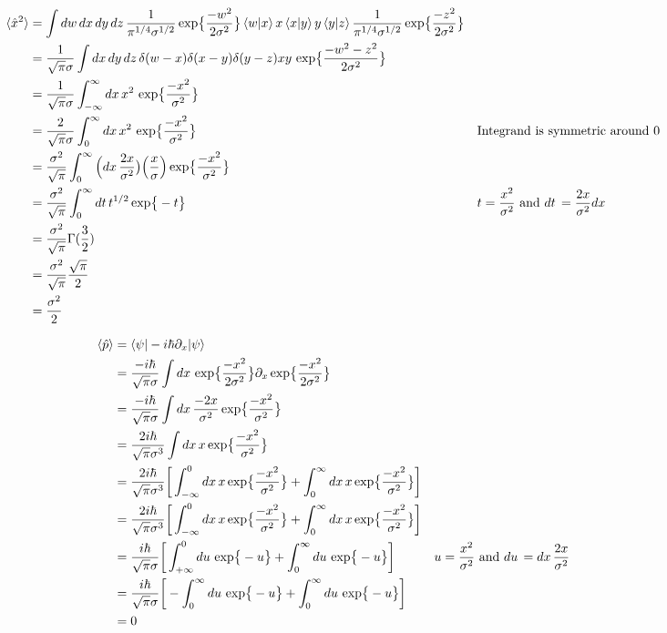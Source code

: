 \documentclass{article}
\newcommand{\D}[1]{{d#1 \,}}
\newcommand{\Poperator}[0]{-i \hbar \partial_x}
\renewcommand{\exp}[1]{\,\text{exp} \big\{ #1 \big\} }
\begin{document}
\begin{align*}
    \braket{\hat{x}^2}
    &= \int \D{w}\D{x}\D{y}\D{z}
        \frac{1}{\pi^{1/4}\sigma^{1/2}} \exp{\frac{-w^2}{2\sigma^2}}
        \braket{w|x}x\braket{x|y}y\braket{y|z}
        \frac{1}{\pi^{1/4}\sigma^{1/2}} \exp{\frac{-z^2}{2\sigma^2}} \\
    &= \frac{1}{\sqrt{\pi}\sigma} \int \D{x}\D{y}\D{z}
        \delta(w-x)\delta(x-y)\delta(y-z) xy \, \exp{\frac{-w^2-z^2}{2\sigma^2}} \\
    &= \frac{1}{\sqrt{\pi}\sigma} \int_{-\infty}^{\infty} \D{x} x^2 \, \exp{\frac{-x^2}{\sigma^2}} \\
    &= \frac{2}{\sqrt{\pi}\sigma} \int_{0}^{\infty} \D{x} x^2 \, \exp{\frac{-x^2}{\sigma^2}} 
        && \text{Integrand is symmetric around 0} \\
    &= \frac{\sigma^2}{\sqrt{\pi}} \int_{0}^{\infty} \Big( \D{x} \frac{2x}{\sigma^2} \big) \Big( \frac{x}{\sigma} \Big) \exp{\frac{-x^2}{\sigma^2}} \\
    &= \frac{\sigma^2}{\sqrt{\pi}} \int_{0}^{\infty} \D{t} t^{1/2} \exp{-t}
        && t = \frac{x^2}{\sigma^2} \text{ and } \D{t} = \frac{2x}{\sigma^2}\D{x}\\
    &= \frac{\sigma^2}{\sqrt{\pi}} \Gamma(\frac{3}{2}) \\
    &= \frac{\sigma^2}{\sqrt{\pi}} \frac{\sqrt{\pi}}{2} \\
    &= \frac{\sigma^2}{2}
\end{align*}

\begin{align*}
    \braket{\hat{p}}
    &= \braket{\psi|\Poperator|\psi} \\
    &= \frac{-i \hbar}{\sqrt{\pi}\sigma} \int \D{x} \exp{\frac{-x^2}{2\sigma^2}} \partial_x \exp{\frac{-x^2}{2\sigma^2}} \\
    &= \frac{-i \hbar}{\sqrt{\pi}\sigma} \int \D{x} \frac{-2x}{\sigma^2} \exp{\frac{-x^2}{\sigma^2}} \\
    &= \frac{2 i \hbar}{\sqrt{\pi}\sigma^3} \int \D{x} x \exp{\frac{-x^2}{\sigma^2}} \\
    &= \frac{2 i \hbar}{\sqrt{\pi}\sigma^3} \bigg[ \int_{-\infty}^{0} \D{x} x \exp{\frac{-x^2}{\sigma^2}} + \int_{0}^{\infty} \D{x} x \exp{\frac{-x^2}{\sigma^2}} \bigg] \\
    &= \frac{2 i \hbar}{\sqrt{\pi}\sigma^3} \bigg[ \int_{-\infty}^{0} \D{x} x \exp{\frac{-x^2}{\sigma^2}} + \int_{0}^{\infty} \D{x} x \exp{\frac{-x^2}{\sigma^2}} \bigg] \\
    &= \frac{i \hbar}{\sqrt{\pi}\sigma} \bigg[ \int_{+\infty}^{0} \D{u} \exp{-u} + \int_{0}^{\infty} \D{u} \exp{-u} \bigg]
        && u = \frac{x^2}{\sigma^2} \text{ and } \D{u} = \D{x}\frac{2x}{\sigma^2} \\
    &= \frac{i \hbar}{\sqrt{\pi}\sigma} \bigg[ -\int^{\infty}_{0} \D{u} \exp{-u} + \int_{0}^{\infty} \D{u} \exp{-u} \bigg] \\
    &= 0
\end{align*}
\end{document}
